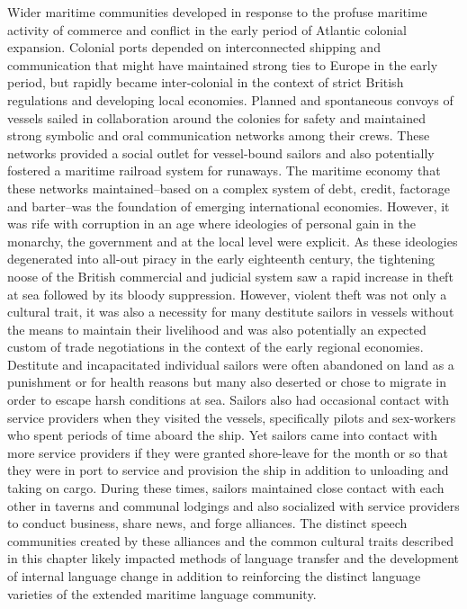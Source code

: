 Wider maritime communities developed in response to the profuse maritime activity of commerce and conflict in the early period of Atlantic colonial expansion. Colonial ports depended on interconnected shipping and communication that might have maintained strong ties to Europe in the early period, but rapidly became inter-colonial in the context of strict British regulations and developing local economies. Planned and spontaneous convoys of vessels sailed in collaboration around the colonies for safety and maintained strong symbolic and oral communication networks among their crews. These networks provided a social outlet for vessel-bound sailors and also potentially fostered a maritime railroad system for runaways. The maritime economy that these networks maintained--based on a complex system of debt, credit, factorage and barter--was the foundation of emerging international economies. However, it was rife with corruption in an age where ideologies of personal gain in the monarchy, the government and at the local level were explicit. As these ideologies degenerated into all-out piracy in the early eighteenth century, the tightening noose of the British commercial and judicial system saw a rapid increase in theft at sea followed by its bloody suppression. However, violent theft was not only a cultural trait, it was also a necessity for many destitute sailors in vessels without the means to maintain their livelihood and was also potentially an expected custom of trade negotiations in the context of the early regional economies. Destitute and incapacitated individual sailors were often abandoned on land as a punishment or for health reasons but many also deserted or chose to migrate in order to escape harsh conditions at sea. Sailors also had occasional contact with service providers when they visited the vessels, specifically pilots and sex-workers who spent periods of time aboard the ship. Yet sailors came into contact with more service providers if they were granted shore-leave for the month or so that they were in port to service and provision the ship in addition to unloading and taking on cargo. During these times, sailors maintained close contact with each other in taverns and communal lodgings and also socialized with service providers to conduct business, share news, and forge alliances. The distinct speech communities created by these alliances and the common cultural traits described in this chapter likely impacted methods of language transfer and the development of internal language change in addition to reinforcing the distinct language varieties of the extended maritime language community. 

